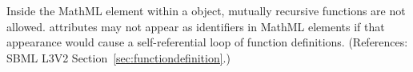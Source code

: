 Inside the  MathML element within a \FunctionDefinition object, mutually recursive functions are not allowed.  \FunctionDefinition {} attributes may not appear as identifiers in  MathML elements if that appearance would cause a self-referential loop of function definitions.  (References: SBML L3V2 Section~\ref{sec:functiondefinition}.)

